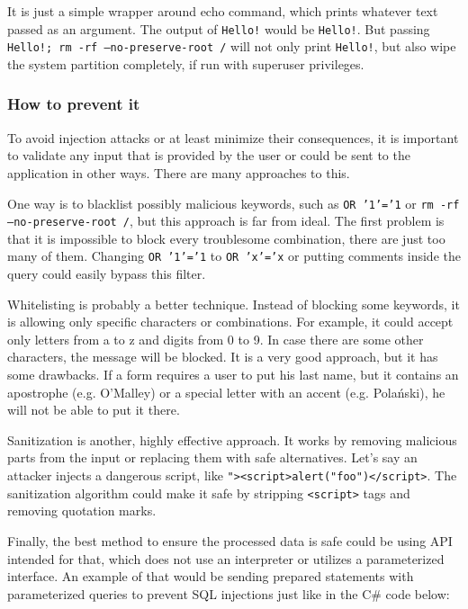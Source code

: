 \documentclass[a4paper]{article}
\begin{document}
It is just a simple wrapper around echo command, which prints whatever text
passed as an argument. The output of \texttt{Hello!} would be \texttt{Hello!}.
But passing \texttt{Hello!; rm -rf --no-preserve-root /} will not only print
\texttt{Hello!}, but also wipe the system partition completely, if run with 
superuser privileges.

\subsubsection{How to prevent it}

To avoid injection attacks or at least minimize their consequences, it is
important to validate any input that is provided by the user or could be sent
to the application in other ways. There are many approaches to
this.\autocites{wahh,injectionprev}

One way is to blacklist possibly malicious keywords, such as \texttt{OR '1'='1}
or \texttt{rm -rf --no-preserve-root /}, but this approach is far from ideal.
The first problem is that it is impossible to block every troublesome
combination, there are just too many of them. Changing \texttt{OR '1'='1} to
\texttt{OR 'x'='x} or putting comments inside the query could easily bypass
this filter.

Whitelisting is probably a better technique. Instead of blocking some keywords,
it is allowing only specific characters or combinations. For example, it could
accept only letters from a to z and digits from 0 to 9. In case there are some
other characters, the message will be blocked. It is a very good approach, but
it has some drawbacks. If a form requires a user to put his last name, but it
contains an apostrophe (e.g. O'Malley) or a special letter with an accent (e.g.
Polański), he will not be able to put it there.

Sanitization is another, highly effective approach. It works by removing
malicious parts from the input or replacing them with safe alternatives. Let's
say an attacker injects a dangerous script, like
\texttt{"><script>alert("foo")</script>}. The sanitization algorithm could make
it safe by stripping \texttt{<script>} tags and removing quotation marks.

Finally, the best method to ensure the processed data is safe could be using
API intended for that, which does not use an interpreter or utilizes a
parameterized interface. An example of that would be sending prepared statements
with parameterized queries to prevent SQL injections just like in the C\# code
below:
\end{document}
